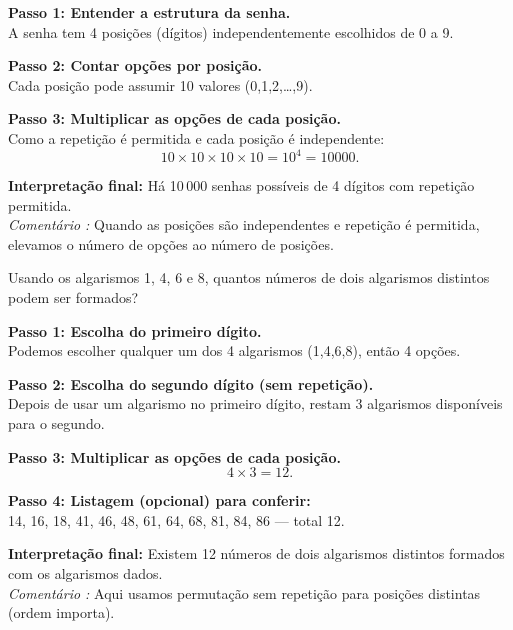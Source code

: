 \documentclass[11pt]{article}
\begin{document}
\begin{tcolorbox}[title=\textbf{Solução 2}, colback=green!6, colframe=green!60!black]
\textbf{Passo 1: Entender a estrutura da senha.}\\
A senha tem 4 posições (dígitos) independentemente escolhidos de 0 a 9.

\textbf{Passo 2: Contar opções por posição.}\\
Cada posição pode assumir 10 valores (0,1,2,\dots,9).

\textbf{Passo 3: Multiplicar as opções de cada posição.}\\
Como a repetição é permitida e cada posição é independente:
\[
10 \times 10 \times 10 \times 10 = 10^4 = 10000.
\]

\textbf{Interpretação final:} Há 10\,000 senhas possíveis de 4 dígitos com repetição permitida.\\
\emph{Comentário :} Quando as posições são independentes e repetição é permitida, elevamos o número de opções ao número de posições.
\end{tcolorbox}


\begin{tcolorbox}[title=\textbf{Questão 3}, colback=blue!6, colframe=blue!70!black]
Usando os algarismos 1, 4, 6 e 8, quantos números de dois algarismos distintos podem ser formados?
\end{tcolorbox}

\begin{tcolorbox}[title=\textbf{Solução 3}, colback=green!6, colframe=green!60!black]
\textbf{Passo 1: Escolha do primeiro dígito.}\\
Podemos escolher qualquer um dos 4 algarismos (1,4,6,8), então 4 opções.

\textbf{Passo 2: Escolha do segundo dígito (sem repetição).}\\
Depois de usar um algarismo no primeiro dígito, restam 3 algarismos disponíveis para o segundo.

\textbf{Passo 3: Multiplicar as opções de cada posição.}\\
\[
4 \times 3 = 12.
\]

\textbf{Passo 4: Listagem (opcional) para conferir:}\\
14, 16, 18, 41, 46, 48, 61, 64, 68, 81, 84, 86 — total 12.

\textbf{Interpretação final:} Existem 12 números de dois algarismos distintos formados com os algarismos dados.\\
\emph{Comentário :} Aqui usamos permutação sem repetição para posições distintas (ordem importa).
\end{tcolorbox}
\end{document}
